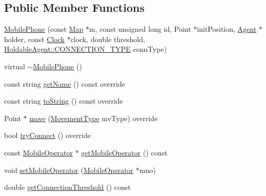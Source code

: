 \subsection*{Public Member Functions}
\begin{DoxyCompactItemize}
\item 
\mbox{\hyperlink{class_mobile_phone_afd7beed70eb2af3baecd9521332ba8eb}{Mobile\+Phone}} (const \mbox{\hyperlink{class_map}{Map}} $\ast$m, const unsigned long id, Point $\ast$init\+Position, \mbox{\hyperlink{class_agent}{Agent}} $\ast$holder, const \mbox{\hyperlink{class_clock}{Clock}} $\ast$clock, double threshold, \mbox{\hyperlink{class_holdable_agent_ae2c334b004d7b9c5a999cf2618e4e518}{Holdable\+Agent\+::\+C\+O\+N\+N\+E\+C\+T\+I\+O\+N\+\_\+\+T\+Y\+PE}} conn\+Type)
\item 
virtual \mbox{\hyperlink{class_mobile_phone_a51db1d9b4fcc52ea9f8d613dae4f6a4b}{$\sim$\+Mobile\+Phone}} ()
\item 
const string \mbox{\hyperlink{class_mobile_phone_a1eeac3141baafa75ebcf26fc3a0e4068}{get\+Name}} () const override
\item 
const string \mbox{\hyperlink{class_mobile_phone_a2b7e556d12a43e380786ad0eccf3ce04}{to\+String}} () const override
\item 
Point $\ast$ \mbox{\hyperlink{class_mobile_phone_a92d77fa5810ddb9c4c482d9c9baea456}{move}} (\mbox{\hyperlink{_movement_type_8h_a8a93b61bc797a7d1907f42796a252493}{Movement\+Type}} mv\+Type) override
\item 
bool \mbox{\hyperlink{class_mobile_phone_ad91afa811cea8ee124167f5941bcda1b}{try\+Connect}} () override
\item 
const \mbox{\hyperlink{class_mobile_operator}{Mobile\+Operator}} $\ast$ \mbox{\hyperlink{class_mobile_phone_aba72025d08c382d8533e0cbb9166999b}{get\+Mobile\+Operator}} () const
\item 
void \mbox{\hyperlink{class_mobile_phone_ad4db8203e8f2e974733357d7c3e6cf28}{set\+Mobile\+Operator}} (\mbox{\hyperlink{class_mobile_operator}{Mobile\+Operator}} $\ast$mno)
\item 
double \mbox{\hyperlink{class_mobile_phone_a57475711a8f85086f50067d219f1181d}{get\+Connection\+Threshold}} () const
\end{DoxyCompactItemize}
